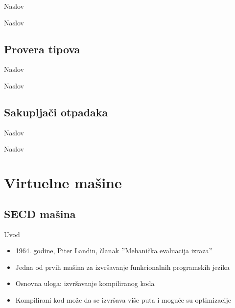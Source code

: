 \documentclass[xcolor={dvipsnames}, 11pt]{beamer}
\begin{document}
\begin{frame}{Naslov}
	
\end{frame}

\begin{frame}{Naslov}
	
\end{frame}


\subsection{Provera tipova}

\begin{frame}{Naslov}
	
\end{frame}

\begin{frame}{Naslov}
	
\end{frame}


\subsection{Sakupljači otpadaka}
\begin{frame}{Naslov}
	
\end{frame}

\begin{frame}{Naslov}

\end{frame}



\section{Virtuelne mašine}

\subsection{SECD mašina}
\begin{frame}{Uvod}
	\begin{itemize}
	\item 1964. godine, Piter Landin, članak $"$Mehanička evaluacija izraza$"$
	\item Jedna od prvih mašina za izvršavanje funkcionalnih programskih jezika
	\item Osnovna uloga: izvršavanje kompiliranog koda
	\item Kompilirani kod može da se izvršava više puta i moguće su optimizacije
	\end{itemize}
\end{frame}
\end{document}
